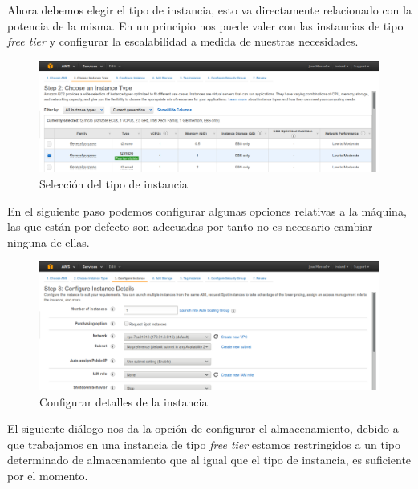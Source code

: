 \newpage

Ahora debemos elegir el tipo de instancia, esto va directamente relacionado con la potencia de la misma. En un principio nos puede valer con las instancias de tipo \textit{free tier} y configurar la escalabilidad a medida de nuestras necesidades.

\begin{figure}[!ht]
  \begin{center}
    \includegraphics[scale=0.30]{../images/kaa/3.png}
		\caption{Selección del tipo de instancia}
    \label{fig:kaa}
	\end{center}
\end{figure}

En el siguiente paso podemos configurar algunas opciones relativas a la máquina, las que están por defecto son adecuadas por tanto no es necesario cambiar ninguna de ellas.

\begin{figure}[!ht]
  \begin{center}
    \includegraphics[scale=0.30]{../images/kaa/4.png}
		\caption{Configurar detalles de la instancia}
    \label{fig:kaa}
	\end{center}
\end{figure}

\newpage

El siguiente diálogo nos da la opción de configurar el almacenamiento, debido a que trabajamos en una instancia de tipo \textit{free tier} estamos restringidos a un tipo determinado de almacenamiento que al igual que el tipo de instancia, es suficiente por el momento.

